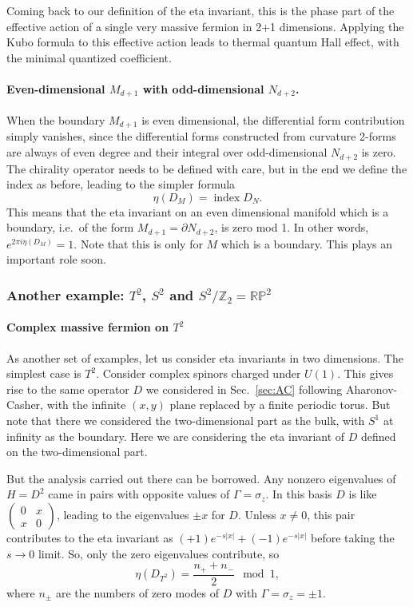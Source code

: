 \documentclass[12pt]{article}
\numberwithin{equation}{section}
\numberwithin{figure}{section}
\theoremstyle{remark}
\def\bZ{\mathbb{Z}}
\def\RP{\mathbb{RP}}
\def\index{\mathop{\mathrm{index}}}
\begin{document}
Coming back to our definition of the eta invariant, this is the phase part of the effective action of a single very massive fermion in 2+1 dimensions.
Applying the Kubo formula to this effective action leads to thermal quantum Hall effect,
with the minimal quantized coefficient.

\paragraph{Even-dimensional $M_{d+1}$ with odd-dimensional $N_{d+2}$.}

When the boundary $M_{d+1}$ is even dimensional, the differential form contribution simply vanishes,
since the differential forms constructed from curvature 2-forms are always of even degree
and their integral over odd-dimensional $N_{d+2}$ is zero.
The chirality operator needs to be defined with care, but in the end we define the index as before, leading to the simpler formula \begin{equation}
\eta(D_M)=\index D_N.
\end{equation}
This means that the eta invariant on an even dimensional manifold which is a boundary, i.e.~of the form $M_{d+1}=\partial N_{d+2}$, is zero mod 1.
In other words, $e^{2\pi i \eta(D_M)}=1$.
Note that this is only for $M$ which is a boundary.
This plays an important role soon.


\subsubsection{Another example: $T^2$, $S^2$ and  $S^2/\bZ_2=\RP^2$}

\paragraph{Complex massive fermion on $T^2$}
As another set of examples, let us consider eta invariants in two dimensions.
The simplest case is $T^2$.
Consider complex spinors charged under $U(1)$.
This gives rise to the same operator $D$ we considered in Sec.~\ref{sec:AC} following Aharonov-Casher,
with the infinite $(x,y)$ plane replaced by a finite periodic torus. 
But note that there we considered the two-dimensional part as the bulk, with $S^1$ at infinity as the boundary.
Here we are considering the eta invariant of $D$ defined on the two-dimensional part.

But the analysis carried out there can be borrowed. Any nonzero eigenvalues of $H=D^2$ came in pairs 
with opposite values of $\Gamma=\sigma_z$. In this basis $D$ is like $\begin{pmatrix}
0 & x\\
x & 0
\end{pmatrix}$, leading to the eigenvalues $\pm x$ for $D$.
Unless $x\neq 0$, this pair contributes to the eta invariant as $(+1)e^{-s|x|}+(-1)e^{-s|x|}$ before taking the $s\to 0$ limit.
So, only the zero eigenvalues contribute, so
\begin{equation}
\eta(D_{T^2})=\frac{n_++n_-}{2} \mod 1,
\end{equation} where $n_\pm$ are the numbers of zero modes of $D$ with $\Gamma=\sigma_z=\pm1$.
\end{document}
